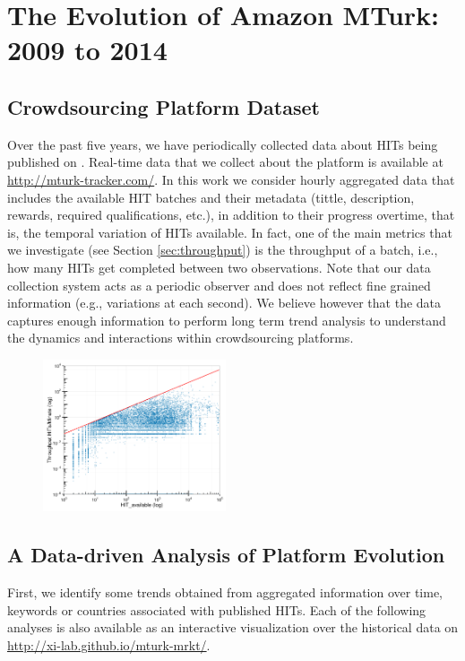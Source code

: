 \section{The Evolution of Amazon MTurk: 2009 to 2014}\label{sec:stats}


\subsection{Crowdsourcing Platform Dataset}
\label{sec:tracker}
Over the past five years, we have periodically collected data about HITs being published on \amt{}.
Real-time data that we collect about the platform is available at \url{http://mturk-tracker.com/}. In this work we consider hourly aggregated data that includes the available HIT batches and their metadata (tittle, description, rewards, required qualifications, etc.), in addition to their progress overtime, that is, the temporal variation of HITs available. In fact, one of the main metrics that we investigate (see Section \ref{sec:throughput}) is the throughput of a batch, i.e.,  how many HITs  get completed between two observations. Note that our data collection system acts  as a periodic observer and does not reflect fine grained information (e.g., variations at each second). We believe however that the data captures enough information to perform long term trend analysis to understand the dynamics and interactions within crowdsourcing platforms.\\

\begin{figure}[ht]
	\centering
		\includegraphics[width=0.48\textwidth]{figures/motiv_mturk}
	\caption{}
	\label{fig:motiv}
\end{figure}

\subsection{A Data-driven Analysis of Platform Evolution}
First, we identify some trends obtained from aggregated information over time, keywords or countries associated with published HITs.  Each of the following analyses is also available as an interactive visualization over the historical data on \url{http://xi-lab.github.io/mturk-mrkt/}.
